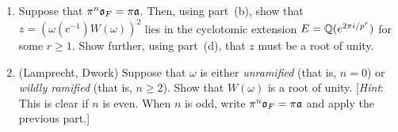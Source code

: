 \begin{exercise}[10]
\begin{enumerate}[label=(\alph*)]
      for every place $v$ of $E$ not dividing the residual characteristic $p$
      of $F$, we have $\abs{W(\omega)}_v = 1$. Using the Artin product
      formula, conclude that if $E$ has a unique place $u$ above $p$, then
      also $\abs{W(\omega)}_u = 1$.
    \item Suppose that $\pi^n\mathfrak{o}_F = \pi\mathfrak{a}$. Then, using part~(b),
      show that $z = (\omega(c^{-1})W(\omega))^2$ lies in the cyclotomic
      extension $E = \mathbb{Q}(e^{2\pi i/p^r})$ for some $r \ge 1$. Show further,
      using part~(d), that $z$ must be a root of unity.
    \item (Lamprecht, Dwork) Suppose that $\omega$ is either
      \emph{unramified} (that is, $n = 0$) or \emph{wildly ramified} (that
      is, $n \ge 2$). Show that $W(\omega)$ is a root of unity.
      [\emph{Hint}: This is clear if $n$ is even. When $n$ is odd, write
      $\pi^n\mathfrak{o}_F = \pi\mathfrak{a}$ and apply the previous part.]
  \end{enumerate}
\end{exercise}

